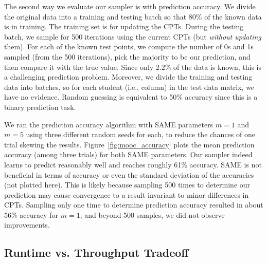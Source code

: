 \documentclass{article} %
\begin{document}
The second way we evaluate our sampler is with prediction accuracy. We divide the original
data into a training and testing batch so that 80\% of the known data is in training. The training
set is for updating the CPTs. During the testing batch, we sample for 500 iterations using the
current CPTs (but \emph{without updating} them). For each of the known test points, we compute the
number of 0s and 1s sampled (from the 500 iterations), pick the majority to be our prediction,
and then compare it with the true value. Since only 2.2\% of the data is known, this is a challenging
prediction problem. Moreover, we divide the training and testing data into batches, so for each
student (i.e., column) in the test data matrix, we have no evidence.  Random guessing is equivalent
to 50\% accuracy since this is a binary prediction task.

We ran the prediction accuracy algorithm with SAME parameters $m=1$ and $m=5$ using three different
random seeds for each, to reduce the chances of one trial skewing the results.
Figure~\ref{fig:mooc_accuracy} plots the mean prediction accuracy (among three trials) for both SAME
parameters. Our sampler indeed learns to predict reasonably well and reaches roughly 61\% accuracy.
SAME is not beneficial in terms of accuracy or even the standard deviation of the accuracies (not
plotted here). This is likely because sampling 500 times to determine our prediction may cause
convergence to a result invariant to minor differences in CPTs.  Sampling only one time to determine
prediction accuracy resulted in about 56\% accuracy for $m=1$, and beyond 500 samples, we did not
observe improvements.

\subsection{Runtime vs. Throughput Tradeoff}\label{ssec:tradeoff}

%
%
\end{document}
